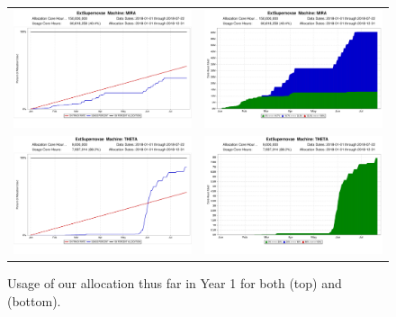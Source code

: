 \documentclass[12pt]{article}
\begin{document}
\begin{figure}
  \begin{tabular}{cc}
    \includegraphics[width=3in]{./on_track_grapg-mira.png} &
    \includegraphics[width=3in]{./categorized_hours_graph-mira.png} \\
    \includegraphics[width=3in]{./on_track_graph-theta.png} &
    \includegraphics[width=3in]{./categorized_hours_graph-theta.png}    
  \end{tabular}  
  \caption{Usage of our allocation thus far in Year 1 for both \mira (top) and \thet (bottom).}
  \label{fig:usage}
\end{figure}
\end{document}

